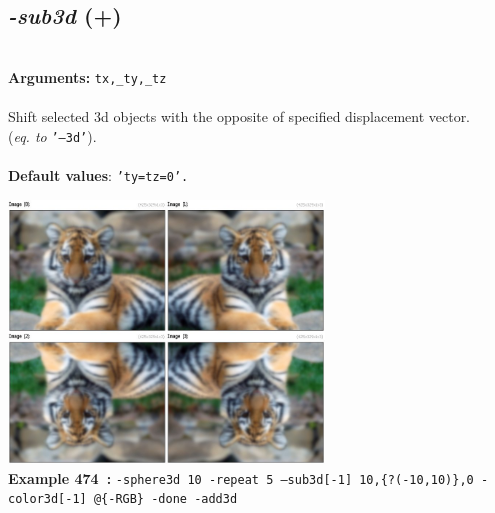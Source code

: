 \documentclass[a4paper,11pt,twoside]{book}
\begin{document}
\subsection{\emph{-sub3d} (+)}\vspace*{-0.5em}
~\\\textbf{Arguments: } 
{\small \texttt{tx,\_ty,\_tz}}\\~\\
Shift selected 3d objects with the opposite of specified displacement vector.
~\\(\emph{eq. to} {\small \texttt{'--3d'}}).
~\\~\\\textbf{Default values}: {\small \texttt{'ty=tz=0'.}}
\begin{center}\includegraphics[keepaspectratio=true,height=7cm,width=\textwidth]{img/gmic_def474.jpg}\\
{\footnotesize \textbf{Example 474~:} \texttt{-sphere3d 10 -repeat 5 --sub3d[-1] 10,\{?(-10,10)\},0 -color3d[-1] @\{-RGB\} -done -add3d}}
\end{center}
\end{document}
